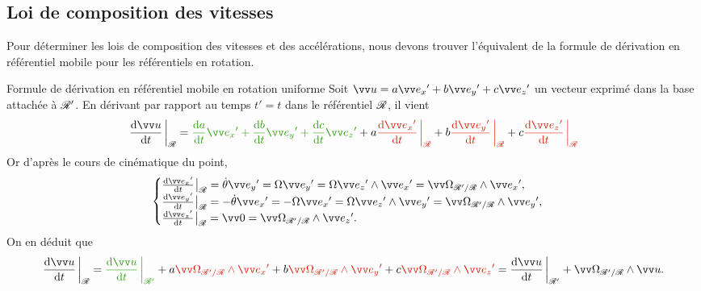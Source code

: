 \documentclass[12pt,fancy]{cours}
\begin{document}
\subsection{Loi de composition des vitesses}


 Pour déterminer les lois de composition des vitesses et des accélérations, nous devons trouver l'équivalent de la formule de dérivation en référentiel mobile pour les référentiels en rotation.

\begin{rappel}{Formule de dérivation en référentiel mobile en rotation uniforme}
Soit $\Vec{u} = a \ex' + b \ey' + c \ez'$ un vecteur exprimé dans la base attachée à $\mathcal{R}'$.
En dérivant par rapport au temps $t'=t$ dans le référentiel $\mathcal{R}$, il vient
\begin{align}\label{eq:deriv_formu}
\dR{\Vec {u}}{t}{\Rcal}  = \JVert{\dd{a}{t} \ex' + \dd{b}{t} \ey' + \dd{c}{t} \ez'} +  a \JRouge{\dR{\ex' }{t}{\Rcal}} + b  \JRouge{\dR{\ey'}{t}{\Rcal}}  + c  \JRouge{\dR{\ez'}{t}{\Rcal}}
\end{align}
Or d'après le cours de cinématique du point,
$$
\begin{cases}
  \dR{\ex'}{t}{\Rcal} = \dot{\theta} \ey' = \Omega \ey' = \Omega \ez' \pv \ex' = \OR \pv \ex', \\
\dR{\ey'}{t}{\Rcal} = -\dot{\theta} \ex' = -\Omega \ex' = \Omega \ez' \pv \ey' = \OR \pv \ey', \\
\dR{\ez'}{t}{\Rcal} = \Vec{0} = \OR \pv \ez'. \\
\end{cases}
$$
On en déduit que
\begin{align}
\dR{\Vec {u}}{t}{\Rcal}
 = \JVert{\dR{\Vec {u}}{t}{\Rcal'}} +  a \JRouge{\OR \pv \ex'} + b  \JRouge{\OR \pv \ey'}  + c  \JRouge{ \OR \pv \ez'} = \dR{\Vec {u}}{t}{\Rcal'} + \OR \pv \Vec{u}.
\end{align}
\end{rappel}
\end{document}
